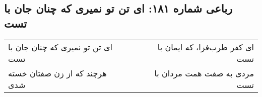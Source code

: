 \begin{center}
\section*{رباعی شماره ۱۸۱: ای تن تو نمیری که چنان جان با تست}
\label{sec:0181}
\begin{longtable}{l p{0.5cm} r}
ای تن تو نمیری که چنان جان با تست
&&
ای کفر طرب‌فزا، که ایمان با تست
\\
هرچند که از زن صفتان خسته شدی
&&
مردی به صفت همت مردان با تست
\\
\end{longtable}
\end{center}
